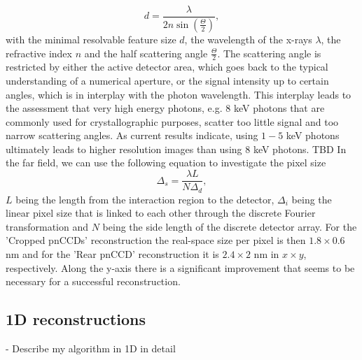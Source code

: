 \begin{equation}
    d = \frac{\lambda}{2n \sin(\frac{\Theta}{2})},
\end{equation}
with the minimal resolvable feature size $d$, the wavelength of the x-rays $\lambda$, the refractive index $n$ and the half scattering angle $\frac{\Theta}{2}$. The scattering angle is restricted by either the active detector area, which goes back to the typical understanding of a numerical aperture, or the signal intensity up to certain angles, which is in interplay with the photon wavelength. This interplay leads to the assessment that very high energy photons, e.g. $8$ keV photons that are commonly used for crystallographic purposes, scatter too little signal and too narrow scattering angles. As current results indicate, using $1-5$ keV photons ultimately leads to higher resolution images than using $8$ keV photons. TBD
In the far field, we can use the following equation to investigate the pixel size \cite{Williams-2010-NJP}
\begin{equation}
    \Delta_{s} = \frac{\lambda L}{N \Delta_{d}},
\label{eq:relation-pixel-fourier}
\end{equation}
$L$ being the length from the interaction region to the detector, $\Delta_{i}$ being the linear pixel size that is linked to each other through the discrete Fourier transformation and $N$ being the side length of the discrete detector array. For the 'Cropped pnCCDs' reconstruction the real-space size per pixel is then $1.8 \times 0.6$ nm and for the 'Rear pnCCD' reconstruction it is $2.4 \times 2$ nm in $x \times y$, respectively. Along the y-axis there is a significant improvement that seems to be necessary for a successful reconstruction.
%
%
%
\subsection{1D reconstructions}
- Describe my algorithm in 1D in detail
